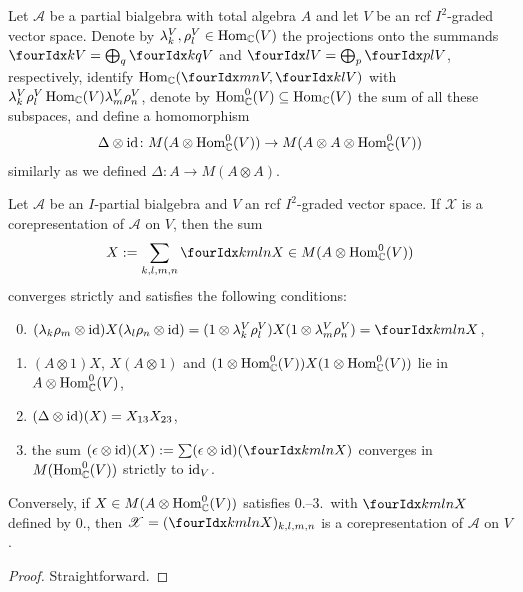 Let $\mathscr{A}$ be a partial bialgebra with total algebra $A$ and
let $V$ be an rcf $I^{2}$-graded vector space.
Denote by $\lambda^{V}_{k},\rho^{V}_{l} \in \operatorname{Hom}_{\mathbb{C}}(V)$ the
projections onto the summands $\Gru{V}{k}{} = \bigoplus_{q}
\Gru{V}{k}{q}$ and $\Gru{V}{}{l}=\bigoplus_{p}\Gru{V}{p}{l}$,
respectively, identify $\Hom_{\C}(\Gru{V}{m}{n},\Gru{V}{k}{l})$ with
$\lambda^{V}_{k}\rho^{V}_{l}\operatorname{Hom}_{\mathbb{C}}(V)\lambda^{V}_{m}\rho^{V}_{n}$,
denote by $\operatorname{Hom}_{\mathbb{C}}^{0}(V) \subseteq \operatorname{Hom}_{\mathbb{C}}(V)$ the sum of all
these subspaces, and define a homomorphism
\begin{align*}
  \Delta \otimes \operatorname{id} \colon M(A \otimes \operatorname{Hom}_{\mathbb{C}}^{0}(V)) \to M(A
  \otimes A \otimes \operatorname{Hom}_{\mathbb{C}}^{0}(V))
\end{align*}
similarly as we defined $ \Delta \colon A \to M(A\otimes A)$.
\begin{Lem} \label{lemma:rep-multiplier}
  Let  $\mathscr{A}$ be an $I$-partial bialgebra and $V$  an rcf $I^{2}$-graded vector space.  If $\mathscr{X}$ is a
  corepresentation of  $\mathscr{A}$ on $V$, then the sum
  \begin{align}
    \label{eq:rep-multiplier}
  X:=\sum_{k,l,m,n} \Gr{X}{k}{l}{m}{n} \in  M(A
  \otimes \Hom_{\C}^{0}(V))
  \end{align}
 converges strictly and satisfies the following conditions:
  \begin{enumerate}\setcounter{enumi}{-1}
  \item $(\lambda_{k}\rho_{m} \otimes \id){X}(\lambda_{l}\rho_{n}
    \otimes \id) = (1 \otimes \lambda^{V}_{k}\rho^{V}_{l}){X}(1 \otimes
    \lambda^{V}_{m}\rho^{V}_{n}) = \Gr{X}{k}{l}{m}{n}$,
  \item $(A \otimes 1){X}$, $ {X}(A \otimes 1)$ and $(1 \otimes
    \operatorname{Hom}^{0}_{\mathbb{C}}(V))X(1 \otimes \operatorname{Hom}^{0}_{\mathbb{C}}(V))$ lie in $A \otimes \operatorname{Hom}_{\mathbb{C}}^{0}(V)$,
  \item $(\Delta\otimes \operatorname{id})(X)=X_{13}X_{23}$, 
  \item the sum $(\epsilon \otimes \id)({X}) :=\sum (\epsilon \otimes
    \id)(\Gr{X}{k}{l}{m}{n})$ converges in $M(\operatorname{Hom}^{0}_{\mathbb{C}}(V))$ strictly
    to $\operatorname{id}_{V}$.
  \end{enumerate}
  Conversely, if $ X \in M(A \otimes \operatorname{Hom}_{\mathbb{C}}^{0}(V))$ satisfies
  0.--3.\ with $\Gr{X}{k}{l}{m}{n}$ defined by 0., then
  $\mathscr{X}=(\Gr{X}{k}{l}{m}{n})_{k,l,m,n}$ is a corepresentation
  of $\mathscr{A}$ on $V$.
\end{Lem}
\begin{proof}
 Straightforward.
\end{proof}



